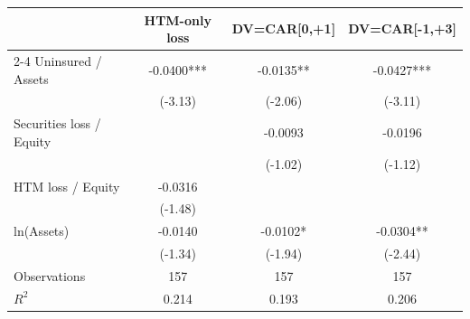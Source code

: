 \begin{tabular}{lccc}
\toprule
& \multicolumn{1}{c}{HTM-only loss} & \multicolumn{1}{c}{DV=CAR[0,+1]} & \multicolumn{1}{c}{DV=CAR[-1,+3]} \\
\cmidrule(lr){2-4}
Uninsured / Assets & -0.0400*** & -0.0135** & -0.0427*** \\
 & (-3.13) & (-2.06) & (-3.11) \\[3pt]
Securities loss / Equity &  & -0.0093 & -0.0196 \\
 &  & (-1.02) & (-1.12) \\[3pt]
HTM loss / Equity & -0.0316 &  &  \\
 & (-1.48) &  &  \\[3pt]
ln(Assets) & -0.0140 & -0.0102* & -0.0304** \\
 & (-1.34) & (-1.94) & (-2.44) \\[3pt]
\midrule
Observations & 157 & 157 & 157 \\
$R^2$ & 0.214 & 0.193 & 0.206 \\
\bottomrule
\end{tabular}